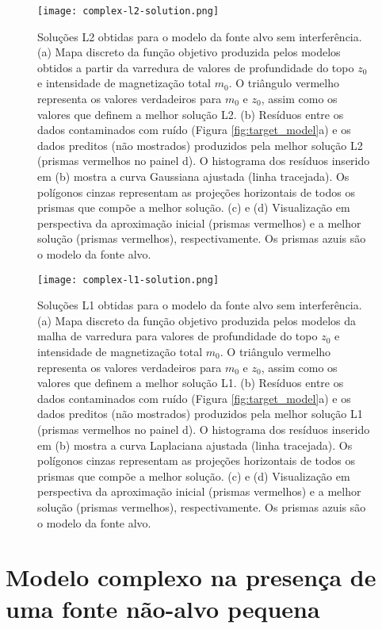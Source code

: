 \begin{figure}[!htb]
	\centering
	\texttt{[image: complex-l2-solution.png]}
	\caption{Soluções L2 obtidas para o modelo da fonte alvo sem interferência. 
		(a) Mapa discreto da função objetivo produzida pelos modelos obtidos a partir da varredura de valores de profundidade do topo $z_{0}$ e intensidade de magnetização total $m_{0}$. 
		O triângulo vermelho representa os valores verdadeiros para $m_{0}$ e $z_{0}$, assim como os valores que definem a melhor solução L2.
		(b) Resíduos entre os dados contaminados com ruído (Figura \ref{fig:target_model}a) 
		e os dados preditos (não mostrados) produzidos pela melhor solução L2 (prismas vermelhos no painel d). 
		O histograma dos resíduos inserido em (b) mostra a curva Gaussiana ajustada (linha tracejada).
		Os polígonos cinzas representam as projeções horizontais de todos os prismas que compõe a melhor solução. 
		(c) e (d) Visualização em perspectiva da aproximação inicial (prismas vermelhos) e 
		a melhor solução (prismas vermelhos), respectivamente. Os prismas azuis são o modelo da fonte alvo. 
	}
	\label{fig:target_l2_result}
\end{figure}
\pagebreak
\begin{figure}[!htb]
	\centering
	\texttt{[image: complex-l1-solution.png]}
	\caption{Soluções L1 obtidas para o modelo da fonte alvo sem interferência. 
		(a) Mapa discreto da função objetivo produzida pelos modelos da malha de varredura para valores de profundidade do topo $z_{0}$ e intensidade de magnetização total $m_{0}$. 
		O triângulo vermelho representa os valores verdadeiros para $m_{0}$ e $z_{0}$, assim como os valores que definem a melhor solução L1.
		(b) Resíduos entre os dados contaminados com ruído (Figura \ref{fig:target_model}a) 
		e os dados preditos (não mostrados) produzidos pela melhor solução L1 (prismas vermelhos no painel d). 
		O histograma dos resíduos inserido em (b) mostra a curva Laplaciana ajustada (linha tracejada).
		Os polígonos cinzas representam as projeções horizontais de todos os prismas que compõe a melhor solução. 
		(c) e (d) Visualização em perspectiva da aproximação inicial (prismas vermelhos) e 
		a melhor solução (prismas vermelhos), respectivamente. Os prismas azuis são o modelo da fonte alvo. 
	}
	\label{fig:target_l1_result}
\end{figure}
\pagebreak


\section{Modelo complexo na presença de uma fonte não-alvo pequena}
\label{sec:target_source_with_small_interference}


